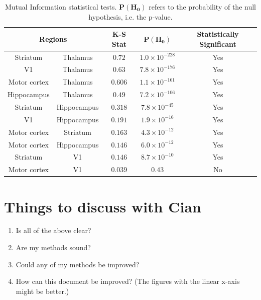 \documentclass[a4paper,12pt]{article}
\theoremstyle{definition}
\begin{document}
\begin{table}[ht!]
  \begin{center}
    \caption{Mutual Information statistical tests. $\mathbf{P(H_0)}$ refers to the probability of the null hypothesis, i.e. the p-value.}
    \label{tab:info_ks_test}
    \begin{tabular}{c|c|c|c|c} %
      \multicolumn{2}{c|}{\textbf{Regions}} & \textbf{K-S Stat} & $\mathbf{P(H_0)}$ & \textbf{Statistically Significant}\\
      \hline
      Striatum & Thalamus & $0.72$ & $1.0 \times 10^{-228}$ & Yes \\
      V1 & Thalamus  & $0.63$ & $7.8 \times 10^{-176}$ & Yes \\
      Motor cortex & Thalamus & $0.606$ & $1.1 \times 10^{-161}$ & Yes \\
      Hippocampus & Thalamus  & $0.49$ & $7.2 \times 10^{-106}$ & Yes \\
      Striatum & Hippocampus & $0.318$ & $7.8 \times 10^{-45}$ & Yes \\
      V1 & Hippocampus & $0.191$ & $1.9 \times 10^{-16}$ & Yes \\
      Motor cortex & Striatum & $0.163$ & $4.3 \times 10^{-12}$ & Yes \\
      Motor cortex & Hippocampus & $0.146$ & $6.0 \times 10^{-12}$ & Yes \\
      Striatum & V1 & $0.146$ & $8.7 \times 10^{-10}$ & Yes \\
      Motor cortex & V1 & $0.039$ & $0.43$ & No \\
    \end{tabular}
  \end{center}
\end{table}


\section*{Things to discuss with Cian}
\begin{enumerate}
  \item Is all of the above clear?
  \item Are my methods sound?
  \item Could any of my methods be improved?
  \item How can this document be improved? (The figures with the linear x-axis might be better.)
\end{enumerate}


\newpage


\end{document}
